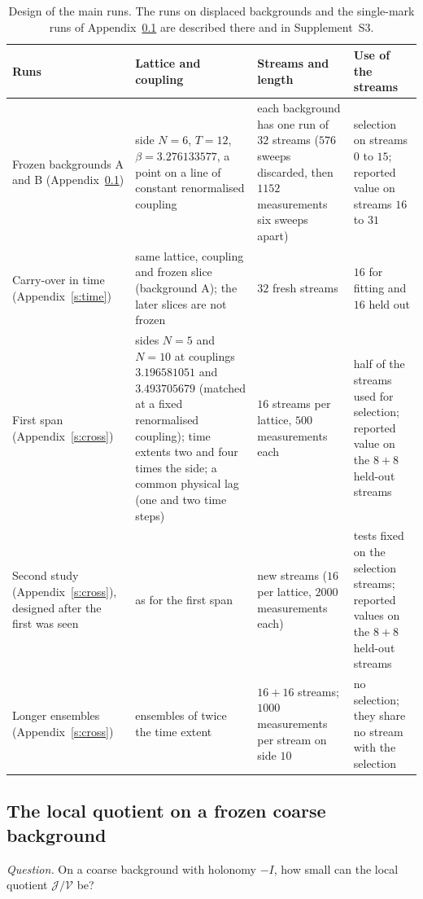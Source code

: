 \begin{table}[tbp]
\caption{Design of the main runs. The runs on displaced backgrounds and the single-mark runs of
Appendix~\ref{s:local} are described there and in Supplement~S3.}\label{tab:runs}
\centering\small
\begin{tabular}{@{}>{\raggedright\arraybackslash}p{}>{\raggedright\arraybackslash}p{}>{\raggedright\arraybackslash}p{}>{\raggedright\arraybackslash}p{}@{}}
\toprule
Runs & Lattice and coupling & Streams and length & Use of the streams \\
\midrule
Frozen backgrounds \textsf{A} and \textsf{B} (Appendix~\ref{s:local}) &
side $N=6$, $T=12$, $\beta=3.276133577$, a point on a line of constant renormalised coupling &
each background has one run of $32$ streams ($576$ sweeps discarded, then $1152$ measurements six sweeps apart) &
selection on streams $0$ to $15$; reported value on streams $16$ to $31$ \\
\addlinespace
Carry-over in time (Appendix~\ref{s:time}) &
same lattice, coupling and frozen slice (background \textsf{A}); the later slices are not frozen &
$32$ fresh streams &
$16$ for fitting and $16$ held out \\
\addlinespace
First span (Appendix~\ref{s:cross}) &
sides $N=5$ and $N=10$ at couplings $3.196581051$ and $3.493705679$ (matched at a fixed renormalised
coupling); time extents two and four times the side; a common physical lag (one and two time steps) &
$16$ streams per lattice, $500$ measurements each &
half of the streams used for selection; reported value on the $8+8$ held-out streams \\
\addlinespace
Second study (Appendix~\ref{s:cross}), designed after the first was seen &
as for the first span &
new streams ($16$ per lattice, $2000$ measurements each) &
tests fixed on the selection streams; reported values on the $8+8$ held-out streams \\
\addlinespace
Longer ensembles (Appendix~\ref{s:cross}) &
ensembles of twice the time extent &
$16+16$ streams; $1000$ measurements per stream on side $10$ &
no selection; they share no stream with the selection \\
\bottomrule
\end{tabular}
\end{table}

\subsection{The local quotient on a frozen coarse background}\label{s:local}
\emph{Question.} On a coarse background with holonomy $-I$, how small can the local quotient
$\mathcal J/\mathcal V$ be?

